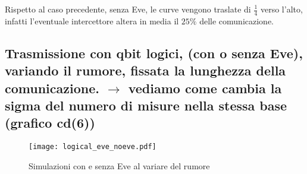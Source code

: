 \documentclass[11 pt, a4paper]{article}
\begin{document}
Rispetto al caso precedente, senza Eve, le curve vengono traslate di $\frac{1}{4}$ verso l'alto, infatti l'eventuale intercettore altera in media il $25\%$ delle comunicazione.

\subsection{Trasmissione con qbit logici, (con o senza Eve), variando il rumore, fissata la lunghezza della comunicazione. $\to$ vediamo come cambia la sigma del numero di misure nella stessa base (grafico cd(6))}

\begin{figure}[htb!]
\centering
\texttt{[image: logical\_eve\_noeve.pdf]}
\caption{Simulazioni con e senza Eve al variare del rumore}
\label{fig:locical_eve_noeve}
\end{figure}
\end{document}
